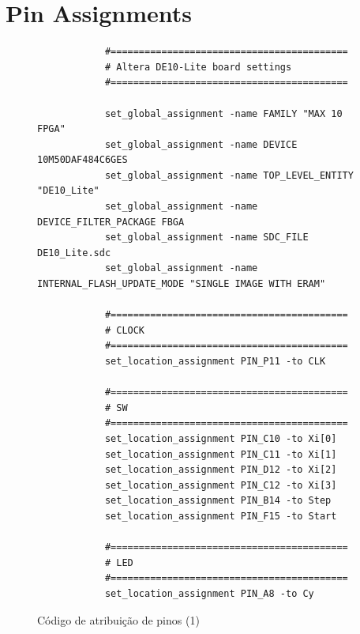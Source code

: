 \section{Pin Assignments}

\vspace*{\fill}
\begin{figure}[H]
    \footnotesize
    \centering
    \begin{minipage}{0.5\textwidth}
        \begin{verbatim}
            #==========================================
            # Altera DE10-Lite board settings
            #==========================================

            set_global_assignment -name FAMILY "MAX 10 FPGA"
            set_global_assignment -name DEVICE 10M50DAF484C6GES
            set_global_assignment -name TOP_LEVEL_ENTITY "DE10_Lite"
            set_global_assignment -name DEVICE_FILTER_PACKAGE FBGA
            set_global_assignment -name SDC_FILE DE10_Lite.sdc
            set_global_assignment -name INTERNAL_FLASH_UPDATE_MODE "SINGLE IMAGE WITH ERAM"

            #==========================================
            # CLOCK
            #==========================================
            set_location_assignment PIN_P11 -to CLK

            #==========================================
            # SW
            #==========================================
            set_location_assignment PIN_C10 -to Xi[0]
            set_location_assignment PIN_C11 -to Xi[1]
            set_location_assignment PIN_D12 -to Xi[2]
            set_location_assignment PIN_C12 -to Xi[3]
            set_location_assignment PIN_B14 -to Step
            set_location_assignment PIN_F15 -to Start

            #==========================================
            # LED
            #==========================================
            set_location_assignment PIN_A8 -to Cy
        \end{verbatim}
    \end{minipage}
    \caption{Código de atribuição de pinos (1)}
\end{figure}
\vspace*{\fill}%

\newpage

